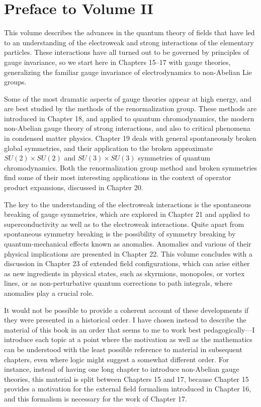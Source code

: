 \section*{Preface to Volume II}

This volume describes the advances in the quantum theory of fields that have
led to an understanding of the electroweak and strong interactions of the
elementary particles. These interactions have all turned out to be governed by
principles of gauge invariance, so we start here in Chapters 15--17 with gauge
theories, generalizing the familiar gauge invariance of electrodynamics to
non-Abelian Lie groups.

Some of the most dramatic aspects of gauge theories appear at high energy, and
are best studied by the methods of the renormalization group. These methods are
introduced in Chapter 18, and applied to quantum chromodynamics, the modern
non-Abelian gauge theory of strong interactions, and also to critical phenomena
in condensed matter physics. Chapter 19 deals with general spontaneously broken
global symmetries, and their application to the broken approximate
$SU(2)\times SU(2)$ and $SU(3)\times SU(3)$ symmetries of quantum chromodynamics.
Both the renormalization group method and broken symmetries find some of their
most interesting applications in the context of operator product expansions,
discussed in Chapter 20.

The key to the understanding of the electroweak interactions is the spontaneous
breaking of gauge symmetries, which are explored in Chapter 21 and applied to
superconductivity as well as to the electroweak interactions. Quite apart from
spontaneous symmetry breaking is the possibility of symmetry breaking by
quantum-mechanical effects known as anomalies. Anomalies and various of their
physical implications are presented in Chapter 22. This volume concludes with a
discussion in Chapter 23 of extended field configurations, which can arise
either as new ingredients in physical states, such as skyrmions, monopoles, or
vortex lines, or as non-perturbative quantum corrections to path integrals,
where anomalies play a crucial role.

It would not be possible to provide a coherent account of these developments if
they were presented in a historical order. I have chosen instead to describe
the material of this book in an order that seems to me to work best
pedagogically---I introduce each topic at a point where the motivation as well
as the mathematics can be understood with the least possible reference to
material in subsequent chapters, even where logic might suggest a somewhat
different order. For instance, instead of having one long chapter to introduce
non-Abelian gauge theories, this material is split between Chapters 15 and 17,
because Chapter 15 provides a motivation for the external field formalism
introduced in Chapter 16, and this formalism is necessary for the work of
Chapter 17.

